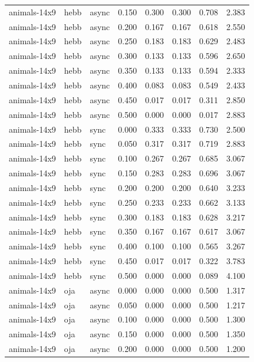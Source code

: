\begin{tabular}{lllrrrrr}
animals-14x9 & hebb & async & 0.150 & 0.300 & 0.300 & 0.708 & 2.383 \\
animals-14x9 & hebb & async & 0.200 & 0.167 & 0.167 & 0.618 & 2.550 \\
animals-14x9 & hebb & async & 0.250 & 0.183 & 0.183 & 0.629 & 2.483 \\
animals-14x9 & hebb & async & 0.300 & 0.133 & 0.133 & 0.596 & 2.650 \\
animals-14x9 & hebb & async & 0.350 & 0.133 & 0.133 & 0.594 & 2.333 \\
animals-14x9 & hebb & async & 0.400 & 0.083 & 0.083 & 0.549 & 2.433 \\
animals-14x9 & hebb & async & 0.450 & 0.017 & 0.017 & 0.311 & 2.850 \\
animals-14x9 & hebb & async & 0.500 & 0.000 & 0.000 & 0.017 & 2.883 \\
animals-14x9 & hebb & sync & 0.000 & 0.333 & 0.333 & 0.730 & 2.500 \\
animals-14x9 & hebb & sync & 0.050 & 0.317 & 0.317 & 0.719 & 2.883 \\
animals-14x9 & hebb & sync & 0.100 & 0.267 & 0.267 & 0.685 & 3.067 \\
animals-14x9 & hebb & sync & 0.150 & 0.283 & 0.283 & 0.696 & 3.067 \\
animals-14x9 & hebb & sync & 0.200 & 0.200 & 0.200 & 0.640 & 3.233 \\
animals-14x9 & hebb & sync & 0.250 & 0.233 & 0.233 & 0.662 & 3.133 \\
animals-14x9 & hebb & sync & 0.300 & 0.183 & 0.183 & 0.628 & 3.217 \\
animals-14x9 & hebb & sync & 0.350 & 0.167 & 0.167 & 0.617 & 3.067 \\
animals-14x9 & hebb & sync & 0.400 & 0.100 & 0.100 & 0.565 & 3.267 \\
animals-14x9 & hebb & sync & 0.450 & 0.017 & 0.017 & 0.322 & 3.783 \\
animals-14x9 & hebb & sync & 0.500 & 0.000 & 0.000 & 0.089 & 4.100 \\
animals-14x9 & oja & async & 0.000 & 0.000 & 0.000 & 0.500 & 1.317 \\
animals-14x9 & oja & async & 0.050 & 0.000 & 0.000 & 0.500 & 1.217 \\
animals-14x9 & oja & async & 0.100 & 0.000 & 0.000 & 0.500 & 1.300 \\
animals-14x9 & oja & async & 0.150 & 0.000 & 0.000 & 0.500 & 1.350 \\
animals-14x9 & oja & async & 0.200 & 0.000 & 0.000 & 0.500 & 1.200 \\

\end{tabular}
